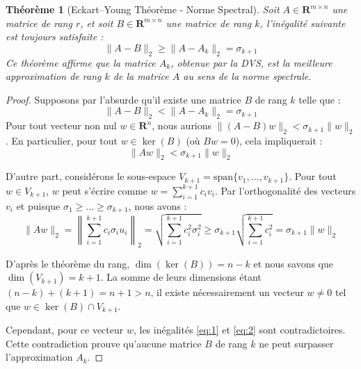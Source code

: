 \documentclass[12pt]{report}
\newtheorem{theorem}{Th\'{e}or\`{e}me}
\newcommand{\R}{\mathbf{R}}     %
\begin{document}
\begin{theorem}[Eckart–Young Théorème - Norme Spectral]
    Soit $A \in \R^{m \times n}$ une matrice de rang $r$, et soit $B \in \R^{m \times n}$ une matrice de rang $k$, l'inégalité suivante est toujours satisfaite :
    \begin{equation}
        \|A - B\|_2 \geq \|A - A_k\|_2 = \sigma_{k+1}
    \end{equation}
    Ce théorème affirme que la matrice $A_k$, obtenue par la DVS, est la meilleure approximation de rang $k$ de la matrice $A$ au sens de la norme spectrale.
\end{theorem}

\begin{proof}
    Supposons par l'absurde qu'il existe une matrice $B$ de rang $k$ telle que :
    \begin{equation}
        \|A - B\|_2 < \|A - A_k\|_2 = \sigma_{k+1}
    \end{equation}
    Pour tout vecteur non nul $w \in \R^n$, nous aurions $\|(A - B)w\|_2 < \sigma_{k+1}\|w\|_2$. En particulier, pour tout $w \in \ker(B)$ (où $Bw = 0$), cela impliquerait :
    \begin{equation} \label{eq:1}
        \|Aw\|_2 < \sigma_{k+1}\|w\|_2
    \end{equation}


    \noindent D'autre part, considérons le sous-espace $V_{k+1} = \text{span}\{v_1, \dots, v_{k+1}\}$. Pour tout $w \in V_{k+1}$, $w$ peut s'écrire comme $w = \sum_{i=1}^{k+1} c_i v_i$. Par l'orthogonalité des vecteurs $v_i$ et puisque $\sigma_1 \ge \dots \ge \sigma_{k+1}$, nous avons :
    \begin{equation} \label{eq:2}
        \|Aw\|_2 = \left\| \sum_{i=1}^{k+1} c_i \sigma_i u_i \right\|_2 = \sqrt{\sum_{i=1}^{k+1} c_i^2 \sigma_i^2} \ge \sigma_{k+1} \sqrt{\sum_{i=1}^{k+1} c_i^2} = \sigma_{k+1}\|w\|_2
    \end{equation}


    \noindent D'après le théorème du rang, $\dim(\ker(B)) = n - k$ et nous savons que $\dim(V_{k+1}) = k + 1$. La somme de leurs dimensions étant $(n-k) + (k+1) = n+1 > n$, il existe nécessairement un vecteur $w \neq 0$ tel que $w \in \ker(B) \cap V_{k+1}$.


    \noindent Cependant, pour ce vecteur $w$, les inégalités \eqref{eq:1} et \eqref{eq:2} sont contradictoires. Cette contradiction prouve qu'aucune matrice $B$ de rang $k$ ne peut surpasser l'approximation $A_k$.
\end{proof}
\end{document}
